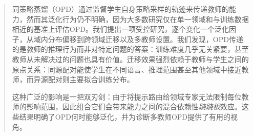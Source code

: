 \begin{abstract}
同策略蒸馏（OPD）通过监督学生自身策略采样的轨迹来传递教师的能力，然而其泛化行为仍不明确，因为大多数研究仅在单一领域和与训练数据相近的基准上评估OPD。我们提出一项受控研究，逐个变化一个泛化因子，从域内分布偏移到跨领域迁移以及多教师设置。我们发现，OPD传递的是教师的推理行为而非对特定问题的答案：训练难度几乎无关紧要，甚至教师从未解决过的问题也具有价值。迁移效果强烈依赖于教师与学生之间的原点关系：同源配对能使学生在不同语言、推理范围甚至其他领域中接近教师，而异源配对则主要拟合训练分布。

这种广泛的影响是一把双刃剑：由于将提示路由给领域专家无法限制每位教师的影响范围，因此组合它们会带来能力之间的混合依赖性\emph{跷跷板}效应。这些结果明确了OPD何时能够泛化，并为诊断多教师OPD提供了有用的视角。
\end{abstract}

